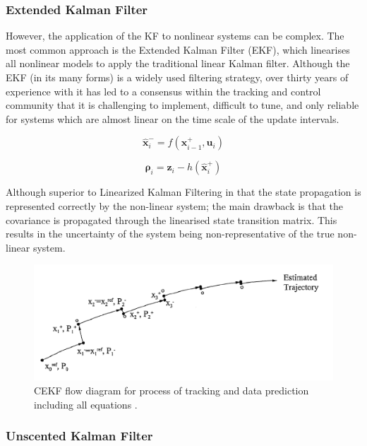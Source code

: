 \subsubsection{Extended Kalman Filter}

However, the application of the KF to nonlinear systems can be complex. The most common approach is the Extended Kalman Filter (EKF), which linearises all nonlinear models to apply the traditional linear Kalman filter. Although the EKF (in its many forms) is a widely used filtering strategy, over thirty years of experience with it has led to a consensus within the tracking and control community that it is challenging to implement, difficult to tune, and only reliable for systems which are almost linear on the time scale of the update intervals.

\begin{equation}
   \hat{\bm{x}}_{i}^- = f({\bm{x}}_{i-1}^+,\bm{u}_{i})
\end{equation}

\begin{equation}
   \bm{\rho}_i = \bm{z}_i - h(\hat{\bm{x}}_{i}^+)
\end{equation}

Although superior to Linearized Kalman Filtering in that the state propagation
is represented correctly by the non-linear system; the main drawback is that the
covariance is propagated through the linearised state transition matrix. This
results in the uncertainty of the system being non-representative of the true
non-linear system.

\begin{figure}[htp]
    \centering
    \includegraphics[width=0.8\linewidth]{graphics/ekf.PNG}
    \caption{CEKF flow diagram for process of tracking and data prediction including all equations \cite{3}.}
    \label{fig:LKF}
\end{figure}

\subsubsection{Unscented Kalman Filter}

